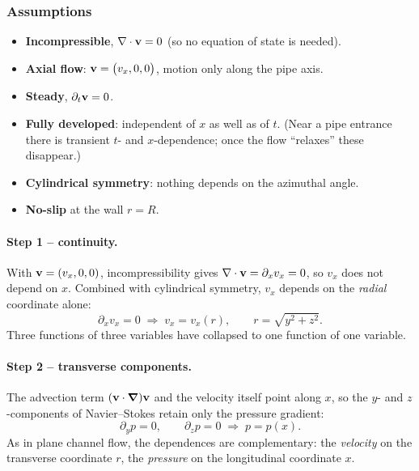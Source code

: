 \documentclass[../main.tex]{subfiles}
\begin{document}
\subsubsection*{Assumptions}
\begin{itemize}
  \item \textbf{Incompressible}, $\nabla \cdot\mathbf{v}=0$ (so no equation of state is needed).
  \item \textbf{Axial flow}: $\mathbf{v}=\big(v_x,0,0\big)$, motion only along the pipe axis.
  \item \textbf{Steady}, $\partial_t\mathbf{v}=0$.
  \item \textbf{Fully developed}: independent of $x$ as well as of $t$. (Near a pipe entrance there is transient $t$- and $x$-dependence; once the flow ``relaxes'' these disappear.)
  \item \textbf{Cylindrical symmetry}: nothing depends on the azimuthal angle.
  \item \textbf{No-slip} at the wall $r=R$.
\end{itemize}

\paragraph{Step 1 -- continuity.} With $\mathbf{v}=(v_x,0,0)$, incompressibility gives $\nabla \cdot\mathbf{v}=\partial_x v_x=0$, so $v_x$ does not depend on $x$. Combined with cylindrical symmetry, $v_x$ depends on the \emph{radial} coordinate alone:
\begin{equation}
  \partial_x v_x=0 \;\Longrightarrow\; v_x=v_x(r),\qquad r=\sqrt{y^2+z^2}.
  \label{eq:lec20_continuity}
\end{equation}
Three functions of three variables have collapsed to one function of one variable.

\paragraph{Step 2 -- transverse components.} The advection term $(\mathbf{v}\cdot\grad)\mathbf{v}$ and the velocity itself point along $x$, so the $y$- and $z$-components of Navier--Stokes retain only the pressure gradient:
\begin{equation}
  \partial_y p=0,\qquad \partial_z p=0 \;\Longrightarrow\; p=p(x).
  \label{eq:lec20_transverse}
\end{equation}
As in plane channel flow, the dependences are complementary: the \emph{velocity} on the transverse coordinate $r$, the \emph{pressure} on the longitudinal coordinate $x$.
\end{document}
